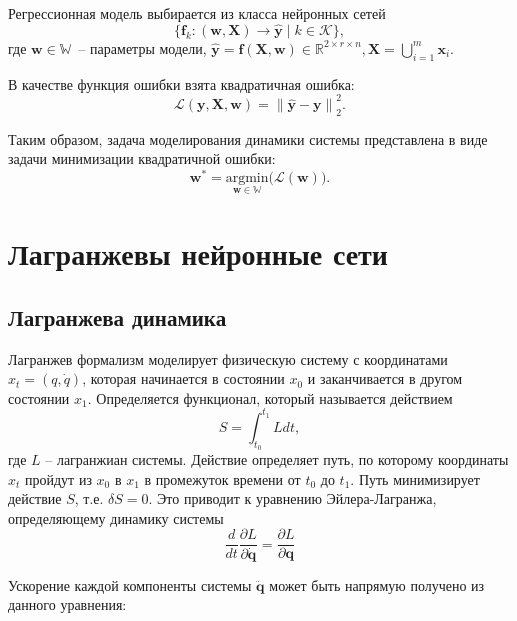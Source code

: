 \documentclass[12pt]{article}
\begin{document}
Регрессионная модель выбирается из класса нейронных сетей
$$\{\mathbf{f}_k\colon(\mathbf{w}, \mathbf{X})\to  \hat{\mathbf{y}} \mid k \in \mathcal{K}\},$$ где $\mathbf{w} \in \mathbb{W}$~-- параметры модели, $\hat{\mathbf{y}} = \mathbf{f} (\mathbf{X},\mathbf{w}) \in \mathbb{R}^{2\times r \times n}, \mathbf{X} = \bigcup_{i=1}^m \mathbf{x}_i$.

В качестве функция ошибки взята квадратичная ошибка: 
$$\mathcal{L}(\mathbf{y}, \mathbf{X}, \mathbf{w}) =\left\lVert \hat{\mathbf{y}} - \mathbf{y} \right\rVert^{2}_2.$$

Таким образом, задача моделирования динамики системы представлена в виде задачи минимизации квадратичной ошибки: 
$$\textbf{w}^* = \underset{\mathbf{w}\in\mathbb{W}}{\text{argmin}}\bigl(\mathcal{L}(\textbf{w})\bigr).$$


\section{Лагранжевы нейронные сети}
\subsection{Лагранжева динамика}		

Лагранжев формализм \cite{Cranmer2020LagrangianNN, goldstein:mechanics, class_mechanics, arnold_mechanics} моделирует физическую систему с координатами $x_t = (q, \dot{q})$, которая начинается в состоянии $x_0$ и заканчивается в другом состоянии $x_1$. Определяется функционал, который называется действием
$$S=\int_{t_{0}}^{t_{1}} L d t,$$
 где $L$ -- лагранжиан системы. Действие определяет путь, по которому координаты $x_t$ пройдут из $x_0$ в $x_1$ в промежуток времени от $t_0$ до $t_1$. Путь минимизирует действие $S$, т.е. $\delta S = 0$. Это приводит к уравнению Эйлера-Лагранжа, определяющему динамику системы
$$\frac{d}{d t} \frac{\partial L}{\partial \dot{\mathbf{q}}}=\frac{\partial L}{\partial \mathbf{q}}$$

Ускорение каждой компоненты системы $ \ddot{\mathbf{q}}$ может быть напрямую получено из данного уравнения:
\end{document}
